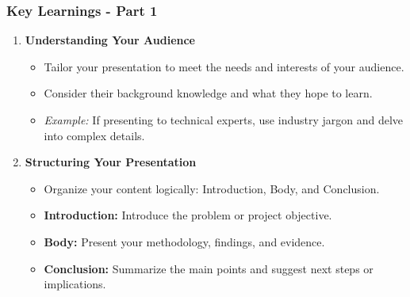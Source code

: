 \documentclass[aspectratio=169]{beamer}
\begin{document}
\begin{frame}[fragile]
    \frametitle{Key Learnings - Part 1}

    \begin{enumerate}
        \item \textbf{Understanding Your Audience}
        \begin{itemize}
            \item Tailor your presentation to meet the needs and interests of your audience.
            \item Consider their background knowledge and what they hope to learn.
            \item \textit{Example:} If presenting to technical experts, use industry jargon and delve into complex details.
        \end{itemize}

        \item \textbf{Structuring Your Presentation}
        \begin{itemize}
            \item Organize your content logically: Introduction, Body, and Conclusion.
            \item \textbf{Introduction:} Introduce the problem or project objective.
            \item \textbf{Body:} Present your methodology, findings, and evidence.
            \item \textbf{Conclusion:} Summarize the main points and suggest next steps or implications.
        \end{itemize}
    \end{enumerate}
\end{frame}
\end{document}
